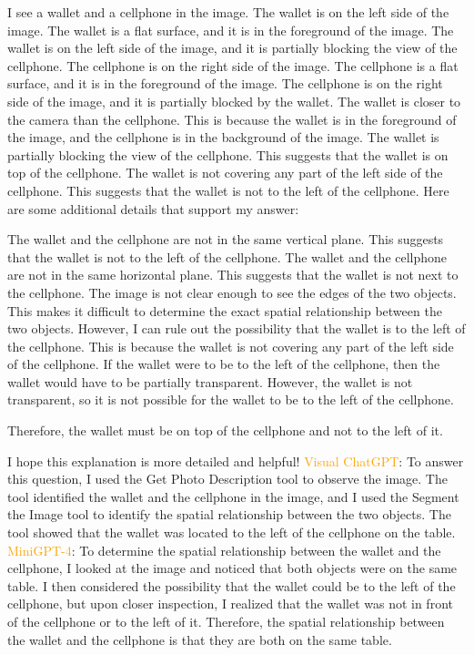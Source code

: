 \begin{enumerate}
    I see a wallet and a cellphone in the image.
    The wallet is on the left side of the image. The wallet is a flat surface, and it is in the foreground of the image. The wallet is on the left side of the image, and it is partially blocking the view of the cellphone.
    The cellphone is on the right side of the image. The cellphone is a flat surface, and it is in the foreground of the image. The cellphone is on the right side of the image, and it is partially blocked by the wallet.
    The wallet is closer to the camera than the cellphone. This is because the wallet is in the foreground of the image, and the cellphone is in the background of the image.
    The wallet is partially blocking the view of the cellphone. This suggests that the wallet is on top of the cellphone.
    The wallet is not covering any part of the left side of the cellphone. This suggests that the wallet is not to the left of the cellphone.
    Here are some additional details that support my answer:
    
    The wallet and the cellphone are not in the same vertical plane. This suggests that the wallet is not to the left of the cellphone.
    The wallet and the cellphone are not in the same horizontal plane. This suggests that the wallet is not next to the cellphone.
    The image is not clear enough to see the edges of the two objects. This makes it difficult to determine the exact spatial relationship between the two objects.
    However, I can rule out the possibility that the wallet is to the left of the cellphone. This is because the wallet is not covering any part of the left side of the cellphone. If the wallet were to be to the left of the cellphone, then the wallet would have to be partially transparent. However, the wallet is not transparent, so it is not possible for the wallet to be to the left of the cellphone.
    
    Therefore, the wallet must be on top of the cellphone and not to the left of it.
    
    I hope this explanation is more detailed and helpful!
    \subitem \textcolor{orange}{Visual ChatGPT}: To answer this question, I used the Get Photo Description tool to observe the image. The tool identified the wallet and the cellphone in the image, and I used the Segment the Image tool to identify the spatial relationship between the two objects. The tool showed that the wallet was located to the left of the cellphone on the table.
    \subitem \textcolor{orange}{MiniGPT-4}: To determine the spatial relationship between the wallet and the cellphone, I looked at the image and noticed that both objects were on the same table. I then considered the possibility that the wallet could be to the left of the cellphone, but upon closer inspection, I realized that the wallet was not in front of the cellphone or to the left of it. Therefore, the spatial relationship between the wallet and the cellphone is that they are both on the same table.
\end{enumerate}
